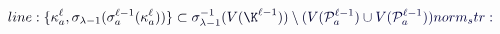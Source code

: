\documentclass[12pt]{article}
\begin{document}
\makeatletter
\renewcommand*{\@textcolor}[3]{%
  \protect\leavevmode
  \begingroup
    \color#1{#2}#3%
  \endgroup
}
\makeatother
\begin{displaymath}
\mathcolor[RGB]{0,0,15}{line:
\{\kappa_a^{\ell},\sigma_{\lambda-1}(\sigma_a^{\ell-1}(\kappa_a^{\ell}))\}\subset} \mathcolor[RGB]{0,0,30}{\sigma_{\lambda-1}^{-1}(V(\K^{\ell-1}))\setminus} \mathcolor[RGB]{0,0,45}{(V(\mathcal{P}_a^{\ell-1})\cup} \mathcolor[RGB]{0,0,60}{V(\mathcal{P}_a^{\ell-1}))

norm_str:}
\end{displaymath}
\end{document}

